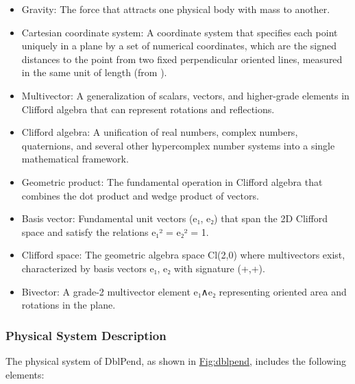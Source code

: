 \documentclass[12pt]{article}
\begin{document}
{\begin{itemize}
\item{Gravity: The force that attracts one physical body with mass to another.}
\item{Cartesian coordinate system: A coordinate system that specifies each point uniquely in a plane by a set of numerical coordinates, which are the signed distances to the point from two fixed perpendicular oriented lines, measured in the same unit of length (from \cite{cartesianWiki}).}
\item{Multivector: A generalization of scalars, vectors, and higher-grade elements in Clifford algebra that can represent rotations and reflections.}
\item{Clifford algebra: A unification of real numbers, complex numbers, quaternions, and several other hypercomplex number systems into a single mathematical framework.}
\item{Geometric product: The fundamental operation in Clifford algebra that combines the dot product and wedge product of vectors.}
\item{Basis vector: Fundamental unit vectors (e₁, e₂) that span the 2D Clifford space and satisfy the relations e₁² = e₂² = 1.}
\item{Clifford space: The geometric algebra space Cl(2,0) where multivectors exist, characterized by basis vectors e₁, e₂ with signature (+,+).}
\item{Bivector: A grade-2 multivector element e₁∧e₂ representing oriented area and rotations in the plane.}
\end{itemize}
\subsubsection{Physical System Description}
\label{Sec:PhysSyst}
The physical system of DblPend, as shown in \hyperref[Figure:dblpend]{Fig:dblpend}, includes the following elements:

}
\end{document}
